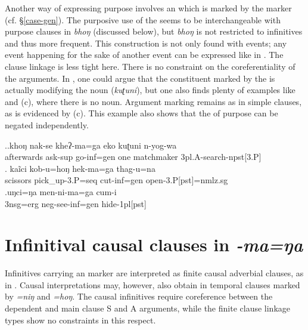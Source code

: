 Another way of expressing purpose involves an  which is marked by the  marker (cf. §\ref{case-gen}). The purposive use of the  seems to be interchangeable with purpose clauses in \emph{bhoŋ} (discussed below), but \emph{bhoŋ} is not restricted to infinitives and thus more frequent. This construction is not only found with  events; any event happening for the sake of another event can be expressed like in \Next. The clause linkage is less tight here. There is no constraint on the coreferentiality of the arguments. In \Next[a], one could argue that the constituent marked by the  is actually modifying the noun (\emph{kuʈuni}), but one also finds plenty of examples like \Next[b] and (c), where there is no noun. Argument marking remains as in simple clauses, as is evidenced by (c). This example also shows that the  of purpose can be negated independently.

\ex.\ag.khoŋ nak-se kheʔ-ma=ga eko kuʈuni n-yog-wa\\
afterwards ask{\sc -sup}  go{\sc -inf=gen} one matchmaker {\sc 3pl.A-}search{\sc -npst[3.P]}\\
 
\bg. kaĩci kob-u=hoŋ hek-ma=ga thag-u=na\\
scissors   pick\_up{\sc -3.P=seq} cut{\sc -inf=gen} open{\sc -3.P[pst]=nmlz.sg}\\
  
\bg.uŋci=ŋa men-ni-ma=ga cum-i\\
{\sc 3nsg=erg} {\sc neg-}see{\sc -inf=gen} hide{\sc -1pl[pst]}\\
		
		
\section{Infinitival causal clauses in \emph{-ma=ŋa}}\label{manga}

Infinitives carrying an  marker are interpreted as finite causal adverbial clauses, as in \Next. Causal interpretations may, however, also obtain in temporal clauses marked by \emph{=niŋ} and \emph{=hoŋ}. The causal infinitives require coreference between the dependent and main clause S and A arguments, while the finite clause linkage types show no constraints in this respect.

